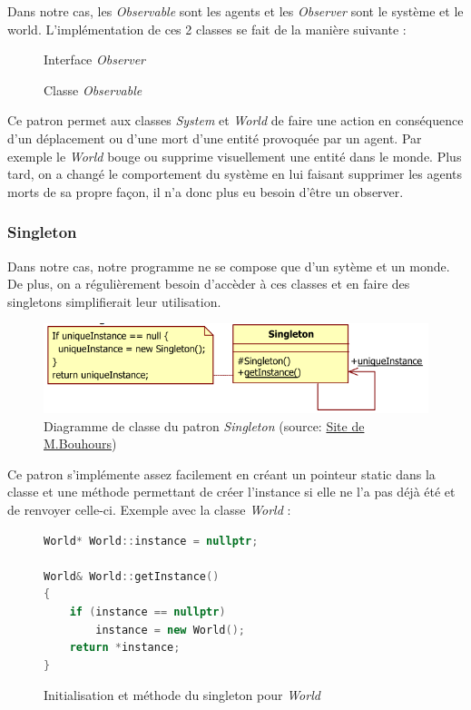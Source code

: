 \documentclass[a4paper, 12pt]{article}
\begin{document}
Dans notre cas, les \emph{Observable} sont les agents et les \emph{Observer} sont le système et le world.
L'implémentation de ces 2 classes se fait de la manière suivante :
\begin{figure}[!h]
  \centering
  \caption{Interface \emph{Observer}}
  
\end{figure}

\begin{figure}[!h]
  \centering
  \caption{Classe \emph{Observable}}
  
\end{figure}

Ce patron permet aux classes \emph{System} et \emph{World} de faire une action en conséquence d'un déplacement
ou d'une mort d'une entité provoquée par un agent. Par exemple le \emph{World} bouge ou supprime visuellement
une entité dans le monde. Plus tard, on a changé le comportement du système en lui faisant supprimer les agents
morts de sa propre façon, il n'a donc plus eu besoin d'être un observer.

\subsubsection{Singleton}
Dans notre cas, notre programme ne se compose que d'un sytème et un monde. De plus, on a régulièrement besoin
d'accèder à ces classes et en faire des singletons simplifierait leur utilisation.
\begin{figure}[!h]
  \centering
  \caption{Diagramme de classe du patron \emph{Singleton} (source: \href{http://www.goprod.bouhours.net/?page=pattern&pat_id=19}{Site de M.Bouhours})}
  \includegraphics[scale=0.7]{img/singleton.png}
\end{figure}

Ce patron s'implémente assez facilement en créant un pointeur static dans la classe et
une méthode permettant de créer l'instance si elle ne l'a pas déjà été et de renvoyer
celle-ci. Exemple avec la classe \emph{World} :
\begin{figure}[!h]
  \centering
  \caption{Initialisation et méthode du singleton pour \emph{World}}
  \begin{lstlisting}[language=c++]
World* World::instance = nullptr;

World& World::getInstance()
{
    if (instance == nullptr)
        instance = new World();
    return *instance;
}
\end{lstlisting}
\end{figure}
\end{document}

